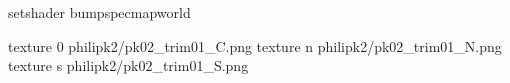setshader bumpspecmapworld

texture 0 philipk2/pk02_trim01_C.png
texture n philipk2/pk02_trim01_N.png
texture s philipk2/pk02_trim01_S.png


